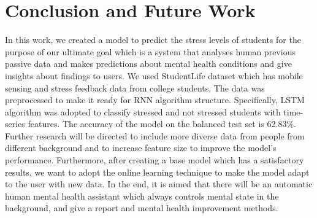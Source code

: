 \documentclass[12pt,oneandhalf,chaparabic,lfm,phd,eng,oneside,pntc]{gsufbe}
\begin{document}
\chapter{Conclusion and Future Work}
\label{chap:Conclusion and Future Work}
In this work, we created a model to predict the stress levels of students for the purpose of our ultimate goal which is a system that analyses human previous passive data and makes predictions about mental health conditions and give insights about findings to users. We used StudentLife dataset which has mobile sensing and stress feedback data from college students. The data was preprocessed to make it ready for RNN algorithm structure. Specifically, LSTM algorithm was adopted to classify stressed and not stressed students with time-series features. The accuracy of the model on the balanced test set is 62.83\%. Further research will be directed to include more diverse data from people from different background and to increase feature size to improve the model's performance. Furthermore, after creating a base model which has a satisfactory results, we want to adopt the online learning technique to make the model adapt to the user with new data. In the end, it is aimed that there will be an automatic human mental health assistant which always controls mental state in the background, and give a report and mental health improvement methods.






\thispagestyle{empty}
\end{document}
